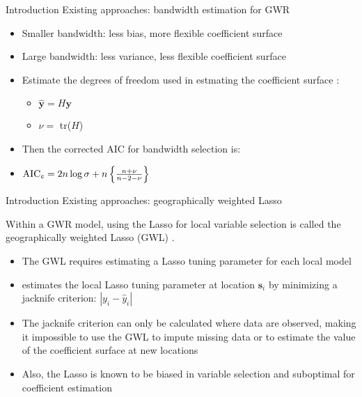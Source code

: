\documentclass[12pt,t,handout]{beamer}
\newcommand{\subt}[1]{{\footnotesize \color{subtitle} {#1}}}
\begin{document}
\begin{frame}{Introduction}
\subt{Existing approaches: bandwidth estimation for GWR}

\bigskip
\begin{itemize}
    \item Smaller bandwidth: less bias, more flexible coefficient surface
    \item Large bandwidth: less variance, less flexible coefficient surface
    \item Estimate the degrees of freedom used in estmating the coefficient surface \citep{Hurvich:1998}:
    \begin{itemize}
        \item $\hat{\bm{y}} = H\bm{y}$
        \item $\nu = $ tr($H$)
    \end{itemize}
    \item Then the corrected AIC for bandwidth selection is:
    \item $\text{AIC}_{\tt c} = 2 n \log{\sigma} + n \left\{\frac{n + \nu}{n - 2 - \nu}\right\}$
\end{itemize}

\end{frame}





\begin{frame}{Introduction}
\subt{Existing approaches: geographically weighted Lasso}

\bigskip
Within a GWR model, using the Lasso \citep{Tibshirani:1996} for local variable selection is called the geographically weighted Lasso (GWL) \citep{Wheeler:2009}.

\begin{itemize}
    \item The GWL requires estimating a Lasso tuning parameter for each local model
    \item \cite{Wheeler:2009} estimates the local Lasso tuning parameter at location $\bm{s}_i$ by minimizing a jacknife criterion: $|y_i - \hat{y}_i|$
    \item The jacknife criterion can only be calculated where data are observed, making it impossible to use the GWL to impute missing data or to estimate the value of the coefficient surface at new locations
    \item Also, the Lasso is known to be biased in variable selection and suboptimal for coefficient estimation
\end{itemize}

\end{frame}
\end{document}
